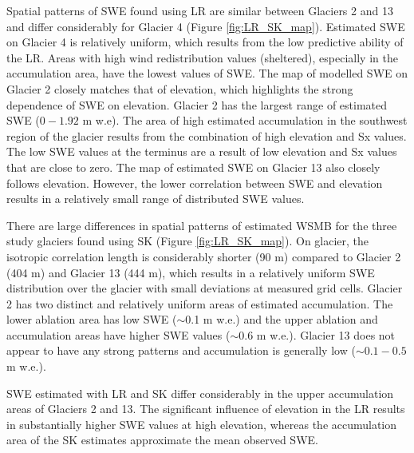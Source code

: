 \documentclass[twocolumn,letterpaper]{igs}
\begin{document}
Spatial patterns of SWE found using LR are similar between Glaciers 2 and 13 and differ considerably for Glacier 4 (Figure \ref{fig:LR_SK_map}). Estimated SWE on Glacier 4 is relatively uniform, which results from the low predictive ability of the LR. Areas with high wind redistribution values (sheltered), especially in the accumulation area, have the lowest values of SWE. The map of modelled SWE on Glacier 2 closely matches that of elevation, which highlights the strong dependence of SWE on elevation. Glacier 2 has the largest range of estimated SWE ($0 - 1.92$ m w.e). The area of high estimated accumulation in the southwest region of the glacier  results from the combination of high elevation and Sx values. The low SWE values at the terminus are a result of low elevation and Sx values that are close to zero. The map of estimated SWE on Glacier 13 also closely follows elevation. However, the lower correlation between SWE and elevation results in a relatively small range of distributed SWE values.

There are large differences in spatial patterns of estimated WSMB for the three study glaciers found using SK (Figure \ref{fig:LR_SK_map}). On glacier, the isotropic correlation length is considerably shorter (90 m) compared to Glacier 2 (404 m) and Glacier 13 (444 m), which results in a relatively uniform SWE distribution over the glacier with small deviations at measured grid cells. Glacier 2 has two distinct and relatively uniform areas of estimated accumulation. The lower ablation area has low SWE ($\sim$0.1 m w.e.) and the upper ablation and accumulation areas have higher SWE values ($\sim$0.6 m w.e.). Glacier 13 does not appear to have any strong patterns and accumulation is generally low ($\sim0.1-0.5$ m w.e.).

SWE estimated with LR and SK differ considerably in the upper accumulation areas of Glaciers 2 and 13. The significant influence of elevation in the LR results in substantially higher SWE values at high elevation, whereas the accumulation area of the SK estimates approximate the mean observed SWE. 
\end{document}
